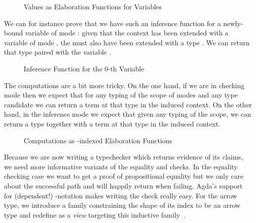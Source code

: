 \begin{figure}[h!]
\caption{Values as Elaboration Functions for Variables\label{fig:elabvalues}}
\end{figure}

We can for instance prove that we have such an inference function for a newly-bound
variable of mode : given that the context has been extended with a variable
of mode , the  must also have been extended with a type .
We can return that type paired with the variable .

\begin{figure}[h]
\caption{Inference Function for the 0-th Variable\label{fig:elabvar0}}
\end{figure}

The computations are a bit more tricky. On the one hand, if we are in checking mode
then we expect that for any typing of the scope of modes and any type candidate we
can  return a term at that type in the induced context. On the other hand,
in the inference mode we expect that given any typing of the scope, we can 
return a type together with a term at that type in the induced context.

\begin{figure}[h]
\caption{Computations as -indexed Elaboration Functions\label{fig:elabcomputations}}
\end{figure}

Because we are now writing a typechecker which returns evidence of its claims, we need
more informative variants of the equality and  checks. In the equality
checking case we want to get a proof of propositional equality but we only care
about the successful path and will happily return  when failing.
Agda's support for (dependent!) -notation makes writing the check
really easy. For the arrow type, we introduce a family  constraining the
shape of its index to be an arrow type and redefine  as a \emph{view} targeting
this inductive family~\cite{DBLP:conf/popl/Wadler87,DBLP:journals/jfp/McBrideM04}.

